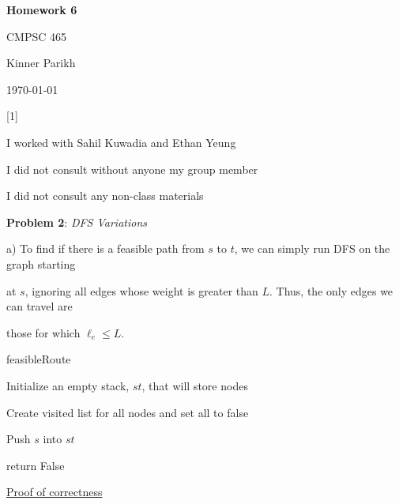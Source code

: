\documentclass{article} %
\newcommand{\question}[2][]{\begin{flushleft}
        \textbf{Problem #1}: \textit{#2}

\end{flushleft}}
\newcommand{\maketitletwo}[2][]{\begin{center}
        \Large{\textbf{Homework #1}
            
            CMPSC 465} %
        \vspace{5pt}
        
        \normalsize{Kinner Parikh  %
        
        \today}        %
        \vspace{40pt}


        \newpage
        
\end{center}}
\begin{document}
    \maketitletwo[6]  %

    \question[1]{}
    \begin{center}
        
        I worked with Sahil Kuwadia and Ethan Yeung
    
        I did not consult without anyone my group member
    
        I did not consult any non-class materials
    \end{center}
    
    \newpage

    \question[2]{DFS Variations}

    a) To find if there is a feasible path from $s$ to $t$, we can simply run DFS on the graph starting 
    
    at $s$, ignoring all edges whose weight is greater than $L$. Thus, the only edges we can travel are 
    
    those for which $\ell_e \leq L$.

    \begin{algorithm}
        \caption{feasibleRoute}



        Initialize an empty stack, $st$, that will store nodes

        Create visited list for all nodes and set all to false
        
        Push $s$ into $st$

        return False

    \end{algorithm}
    \underline{Proof of correctness}
\end{document}

